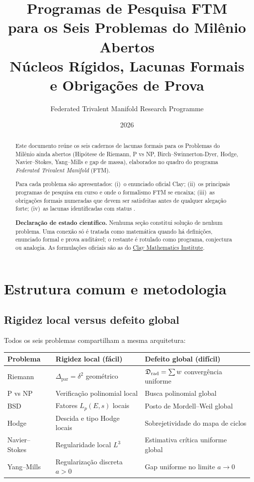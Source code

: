 \documentclass[11pt,a4paper]{article}
\title{Programas de Pesquisa FTM\\
       para os Seis Problemas do Milênio Abertos\\[6pt]
       \large Núcleos Rígidos, Lacunas Formais e Obrigações de Prova}
\author{Federated Trivalent Manifold Research Programme}
\date{2026}
\begin{document}
\maketitle

\begin{abstract}
Este documento reúne os seis cadernos de lacunas formais para os
Problemas do Milênio ainda abertos (Hipótese de Riemann, P vs NP,
Birch–Swinnerton-Dyer, Hodge, Navier–Stokes, Yang–Mills e gap de massa),
elaborados no quadro do programa \emph{Federated Trivalent Manifold} (FTM).

Para cada problema são apresentados:
(i)~o enunciado oficial Clay;
(ii)~os principais programas de pesquisa em curso e onde o formalismo
FTM se encaixa;
(iii)~as obrigações formais numeradas que devem ser satisfeitas
antes de qualquer alegação forte;
(iv)~as lacunas identificadas com status \OPEN.

\textbf{Declaração de estado científico.}
Nenhuma seção constitui solução de nenhum problema.
Uma conexão só é tratada como matemática quando há
definições, enunciado formal e prova auditável;
o restante é rotulado como programa, conjectura ou analogia.
As formulações oficiais são as do
\href{https://www.claymath.org/millennium-problems/}{Clay Mathematics Institute}.
\end{abstract}

\tableofcontents
\clearpage

\section{Estrutura comum e metodologia}

\subsection{Rigidez local versus defeito global}

Todos os seis problemas compartilham a mesma arquitetura:

\begin{center}
\begin{tabular}{lll}
\toprule
Problema & Rigidez local (fácil) & Defeito global (difícil) \\
\midrule
Riemann   & $\Delta_{\mathrm{par}}=\delta^2$ geométrico
          & $\mathfrak{D}_{\mathrm{rad}}=\sum w$ convergência uniforme \\
P vs NP   & Verificação polinomial local
          & Busca polinomial global \\
BSD       & Fatores $L_p(E,s)$ locais
          & Posto de Mordell–Weil global \\
Hodge     & Descida e tipo Hodge locais
          & Sobrejetividade do mapa de ciclos \\
Navier–Stokes & Regularidade local $L^3$
              & Estimativa crítica uniforme global \\
Yang–Mills & Regularização discreta $a>0$
           & Gap uniforme no limite $a\to0$ \\
\bottomrule
\end{tabular}
\end{center}
\end{document}
